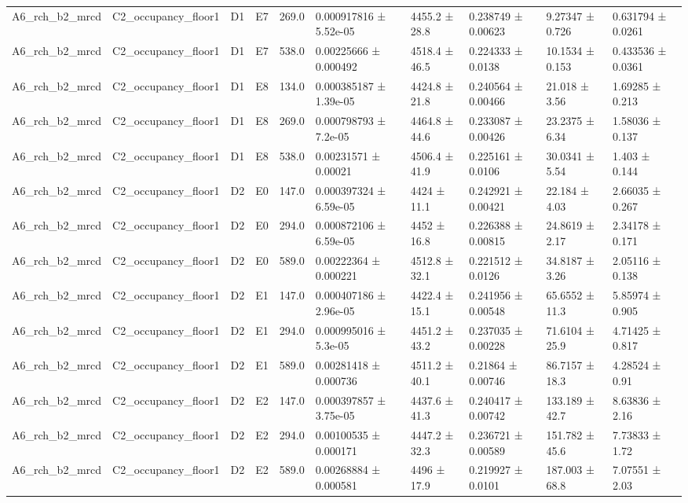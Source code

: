 \begin{table}
\begin{tabular}{llllllllll}
A6\_rch\_b2\_mrcd & C2\_occupancy\_floor1 & D1 & E7 & 269.0 & 0.000917816 ± 5.52e-05 & 4455.2 ± 28.8 & 0.238749 ± 0.00623 & 9.27347 ± 0.726 & 0.631794 ± 0.0261 \\
A6\_rch\_b2\_mrcd & C2\_occupancy\_floor1 & D1 & E7 & 538.0 & 0.00225666 ± 0.000492 & 4518.4 ± 46.5 & 0.224333 ± 0.0138 & 10.1534 ± 0.153 & 0.433536 ± 0.0361 \\
A6\_rch\_b2\_mrcd & C2\_occupancy\_floor1 & D1 & E8 & 134.0 & 0.000385187 ± 1.39e-05 & 4424.8 ± 21.8 & 0.240564 ± 0.00466 & 21.018 ± 3.56 & 1.69285 ± 0.213 \\
A6\_rch\_b2\_mrcd & C2\_occupancy\_floor1 & D1 & E8 & 269.0 & 0.000798793 ± 7.2e-05 & 4464.8 ± 44.6 & 0.233087 ± 0.00426 & 23.2375 ± 6.34 & 1.58036 ± 0.137 \\
A6\_rch\_b2\_mrcd & C2\_occupancy\_floor1 & D1 & E8 & 538.0 & 0.00231571 ± 0.00021 & 4506.4 ± 41.9 & 0.225161 ± 0.0106 & 30.0341 ± 5.54 & 1.403 ± 0.144 \\
A6\_rch\_b2\_mrcd & C2\_occupancy\_floor1 & D2 & E0 & 147.0 & 0.000397324 ± 6.59e-05 & 4424 ± 11.1 & 0.242921 ± 0.00421 & 22.184 ± 4.03 & 2.66035 ± 0.267 \\
A6\_rch\_b2\_mrcd & C2\_occupancy\_floor1 & D2 & E0 & 294.0 & 0.000872106 ± 6.59e-05 & 4452 ± 16.8 & 0.226388 ± 0.00815 & 24.8619 ± 2.17 & 2.34178 ± 0.171 \\
A6\_rch\_b2\_mrcd & C2\_occupancy\_floor1 & D2 & E0 & 589.0 & 0.00222364 ± 0.000221 & 4512.8 ± 32.1 & 0.221512 ± 0.0126 & 34.8187 ± 3.26 & 2.05116 ± 0.138 \\
A6\_rch\_b2\_mrcd & C2\_occupancy\_floor1 & D2 & E1 & 147.0 & 0.000407186 ± 2.96e-05 & 4422.4 ± 15.1 & 0.241956 ± 0.00548 & 65.6552 ± 11.3 & 5.85974 ± 0.905 \\
A6\_rch\_b2\_mrcd & C2\_occupancy\_floor1 & D2 & E1 & 294.0 & 0.000995016 ± 5.3e-05 & 4451.2 ± 43.2 & 0.237035 ± 0.00228 & 71.6104 ± 25.9 & 4.71425 ± 0.817 \\
A6\_rch\_b2\_mrcd & C2\_occupancy\_floor1 & D2 & E1 & 589.0 & 0.00281418 ± 0.000736 & 4511.2 ± 40.1 & 0.21864 ± 0.00746 & 86.7157 ± 18.3 & 4.28524 ± 0.91 \\
A6\_rch\_b2\_mrcd & C2\_occupancy\_floor1 & D2 & E2 & 147.0 & 0.000397857 ± 3.75e-05 & 4437.6 ± 41.3 & 0.240417 ± 0.00742 & 133.189 ± 42.7 & 8.63836 ± 2.16 \\
A6\_rch\_b2\_mrcd & C2\_occupancy\_floor1 & D2 & E2 & 294.0 & 0.00100535 ± 0.000171 & 4447.2 ± 32.3 & 0.236721 ± 0.00589 & 151.782 ± 45.6 & 7.73833 ± 1.72 \\
A6\_rch\_b2\_mrcd & C2\_occupancy\_floor1 & D2 & E2 & 589.0 & 0.00268884 ± 0.000581 & 4496 ± 17.9 & 0.219927 ± 0.0101 & 187.003 ± 68.8 & 7.07551 ± 2.03 \\

\end{tabular}
\end{table}
